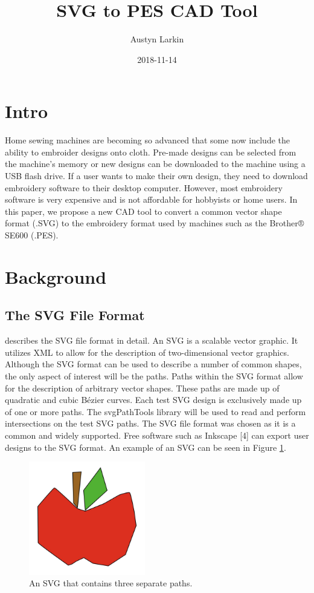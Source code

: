 \documentclass{article}
\title{SVG to PES CAD Tool}
\author{Austyn Larkin}
\date{2018-11-14}
\begin{document}
\maketitle
\section{Intro}
Home sewing machines are becoming so advanced that some now include the ability to embroider designs onto cloth. Pre-made designs can be selected from the machine's memory or new designs can be downloaded to the machine using a USB flash drive. If a user wants to make their own design, they need to download embroidery software to their desktop computer. However, most embroidery software is very expensive and is not affordable for hobbyists or home users. In this paper, we propose a new CAD tool to convert a common vector shape format (.SVG) to the embroidery format used by machines such as the Brother® SE600 (.PES).

\section{Background}

\subsection{The SVG File Format}

\cite{SVGFormat} describes the SVG file format in detail. An SVG is a scalable vector graphic. It utilizes XML to allow for the description of two-dimensional vector graphics. Although the SVG format can be used to describe a number of common shapes, the only aspect of interest will be the paths. Paths within the SVG format allow for the description of arbitrary vector shapes. These paths are made up of quadratic and cubic Bézier curves. Each test SVG design is exclusively made up of one or more paths. The svgPathTools library \cite{svgpathtools} will be used to read and perform intersections on the test SVG paths. The SVG file format was chosen as it is a common and widely supported. Free software such as Inkscape [4] can export user designs to the SVG format. An example of an SVG can be seen in Figure \ref{apple}.

\begin{figure}[H]
    \centering
    \includegraphics[width=2in]{SVGExample}
    \caption{An SVG that contains three separate paths.}
    \label{apple}
\end{figure}
\end{document}
